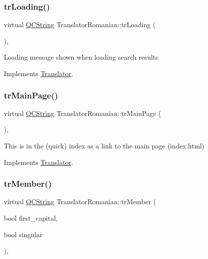 \subsubsection{\texorpdfstring{trLoading()}{trLoading()}}
{\footnotesize\ttfamily virtual \mbox{\hyperlink{class_q_c_string}{Q\+C\+String}} Translator\+Romanian\+::tr\+Loading (\begin{DoxyParamCaption}{ }\end{DoxyParamCaption})\hspace{0.3cm}{\ttfamily [inline]}, {\ttfamily [virtual]}}

Loading message shown when loading search results 

Implements \mbox{\hyperlink{class_translator}{Translator}}.

\mbox{\label{class_translator_romanian_a2ced073e606e5a5549047fe86a6179de}} 
\subsubsection{\texorpdfstring{trMainPage()}{trMainPage()}}
{\footnotesize\ttfamily virtual \mbox{\hyperlink{class_q_c_string}{Q\+C\+String}} Translator\+Romanian\+::tr\+Main\+Page (\begin{DoxyParamCaption}{ }\end{DoxyParamCaption})\hspace{0.3cm}{\ttfamily [inline]}, {\ttfamily [virtual]}}

This is in the (quick) index as a link to the main page (index.\+html) 

Implements \mbox{\hyperlink{class_translator}{Translator}}.

\mbox{\label{class_translator_romanian_a862c25b26835cbbfcb41e0143aa396c1}} 
\subsubsection{\texorpdfstring{trMember()}{trMember()}}
{\footnotesize\ttfamily virtual \mbox{\hyperlink{class_q_c_string}{Q\+C\+String}} Translator\+Romanian\+::tr\+Member (\begin{DoxyParamCaption}\item[{bool}]{first\+\_\+capital,  }\item[{bool}]{singular }\end{DoxyParamCaption})\hspace{0.3cm}{\ttfamily [inline]}, {\ttfamily [virtual]}}

